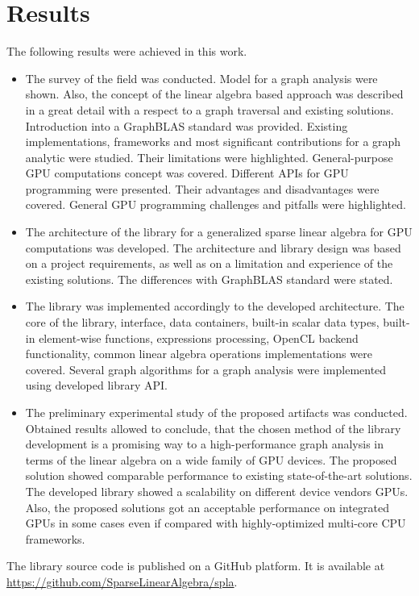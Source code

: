\section{Results}

The following results were achieved in this work.

\begin{itemize}
    \item The survey of the field was conducted. Model for a graph analysis were shown. Also, the concept of the linear algebra based approach was described in a great detail with a respect to a graph traversal and existing solutions. Introduction into a GraphBLAS standard was provided. Existing implementations, frameworks and most significant contributions for a graph analytic were studied. Their limitations were highlighted. General-purpose GPU computations concept was covered. Different APIs for GPU programming were presented. Their advantages and disadvantages were covered. General GPU programming challenges and pitfalls were highlighted. 
    
    \item The architecture of the library for a generalized sparse linear algebra for GPU computations was developed. The architecture and library design was based on a project requirements, as well as on a limitation and experience of the existing solutions. The differences with GraphBLAS standard were stated.
    
    \item The library was implemented accordingly to the developed architecture. The core of the library, interface, data containers, built-in scalar data types, built-in element-wise functions, expressions processing, OpenCL backend functionality, common linear algebra operations implementations were covered. Several graph algorithms for a graph analysis were implemented using developed library API.
    
    \item The preliminary experimental study of the proposed artifacts was conducted. Obtained results allowed to conclude, that the chosen method of the library development is a promising way to a high-performance graph analysis in terms of the linear algebra on a wide family of GPU devices. The proposed solution showed comparable performance to existing state-of-the-art solutions. The developed library showed a scalability on different device vendors GPUs. Also, the proposed solutions got an acceptable performance on integrated GPUs in some cases even if compared with highly-optimized multi-core CPU frameworks.
\end{itemize}

The library source code is published on a GitHub platform. It is available at \url{https://github.com/SparseLinearAlgebra/spla}.
